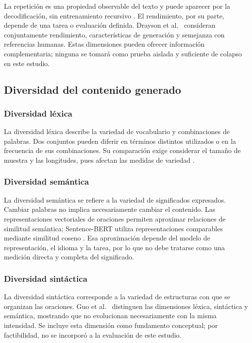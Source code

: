 \documentclass[12pt,letterpaper]{article}
\begin{document}
La repetición es una propiedad observable del texto y puede aparecer por
la decodificación, sin entrenamiento recursivo \cite{holtzman2020}.
El rendimiento, por su parte, depende de una tarea o evaluación definida.
Drayson et al.\ \cite{drayson2025} consideran conjuntamente rendimiento,
características de generación y semejanza con referencias humanas. Estas
dimensiones pueden ofrecer información complementaria; ninguna se tomará
como prueba aislada y suficiente de colapso en este estudio.

\subsection{Diversidad del contenido generado}

\subsubsection{Diversidad léxica}

La diversidad léxica describe la variedad de vocabulario y combinaciones
de palabras. Dos conjuntos pueden diferir en términos distintos utilizados
o en la frecuencia de sus combinaciones. Su comparación exige considerar
el tamaño de muestra y las longitudes, pues afectan las medidas de variedad
\cite{guo2024}.

\subsubsection{Diversidad semántica}

La diversidad semántica se refiere a la variedad de significados expresados.
Cambiar palabras no implica necesariamente cambiar el contenido. Las
representaciones vectoriales de oraciones permiten aproximar relaciones
de similitud semántica; Sentence-BERT utiliza representaciones comparables
mediante similitud coseno \cite{reimers2019}. Esa aproximación depende del
modelo de representación, el idioma y la tarea, por lo que no debe tratarse
como una medición directa y completa del significado.

\subsubsection{Diversidad sintáctica}

La diversidad sintáctica corresponde a la variedad de estructuras con que
se organizan las oraciones. Guo et al.\ \cite{guo2024} distinguen las
dimensiones léxica, sintáctica y semántica, mostrando que no evolucionan
necesariamente con la misma intensidad. Se incluye esta dimensión como
fundamento conceptual; por factibilidad, no se incorporó a la evaluación
de este estudio.
\end{document}
